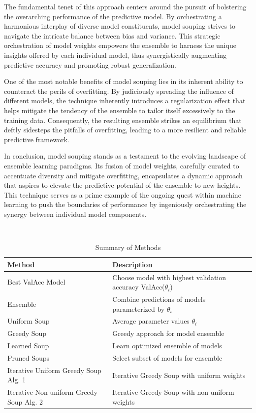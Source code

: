 \documentclass[10pt,twocolumn,letterpaper]{article}
\begin{document}
The fundamental tenet of this approach centers around the pursuit of bolstering the overarching performance of the predictive model. By orchestrating a harmonious interplay of diverse model constituents, model souping strives to navigate the intricate balance between bias and variance. This strategic orchestration of model weights empowers the ensemble to harness the unique insights offered by each individual model, thus synergistically augmenting predictive accuracy and promoting robust generalization.

One of the most notable benefits of model souping lies in its inherent ability to counteract the perils of overfitting. By judiciously spreading the influence of different models, the technique inherently introduces a regularization effect that helps mitigate the tendency of the ensemble to tailor itself excessively to the training data. Consequently, the resulting ensemble strikes an equilibrium that deftly sidesteps the pitfalls of overfitting, leading to a more resilient and reliable predictive framework.

In conclusion, model souping stands as a testament to the evolving landscape of ensemble learning paradigms. Its fusion of model weights, carefully curated to accentuate diversity and mitigate overfitting, encapsulates a dynamic approach that aspires to elevate the predictive potential of the ensemble to new heights. This technique serves as a prime example of the ongoing quest within machine learning to push the boundaries of performance by ingeniously orchestrating the synergy between individual model components.






\begin{table}[htbp]
\centering\
	
\small
\begin{tabular}{p{3.5cm} p{4cm}}
		\toprule
		\textbf{Method} & \textbf{Description} \\
		\midrule
		Best ValAcc Model & Choose model with highest validation accuracy ValAcc($\theta_i$) \\
		Ensemble & Combine predictions of models parameterized by $\theta_i$ \\
		Uniform Soup & Average parameter values $\theta_i$ \ \cite{wortsman2022model} \\
		Greedy Soup  & Greedy approach for model ensemble  \cite{wortsman2022model}\\
		Learned Soup & Learn optimized ensemble of models \cite{wortsman2022model} \\
		Pruned Soups & Select subset of models for ensemble \cite{dansereau2023model} \\
		Iterative Uniform Greedy Soup Alg. 1 & Iterative Greedy Soup with uniform weights \\
		Iterative Non-uniform Greedy Soup Alg. 2 & Iterative Greedy Soup with non-uniform weights \\
		\bottomrule
	\end{tabular}
	\caption{Summary of Methods}
\end{table}
\end{document}
